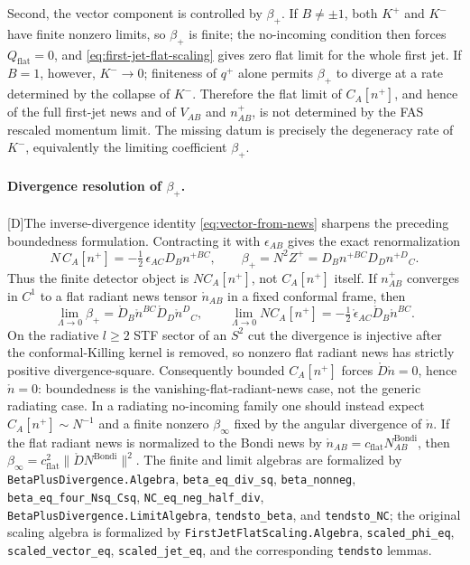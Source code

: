 \documentclass[11pt,a4paper]{article}
\newcommand{\statusD}{\textsf{[D]}}
\begin{document}
Second, the vector component is controlled by \(\beta_+\).  If \(B\neq\pm1\), both \(K^+\) and \(K^-\) have finite nonzero limits, so \(\beta_+\) is finite; the no-incoming condition then forces \(Q_{\mathrm{flat}}=0\), and \eqref{eq:first-jet-flat-scaling} gives zero flat limit for the whole first jet.  If \(B=1\), however, \(K^-\to0\); finiteness of \(q^+\) alone permits \(\beta_+\) to diverge at a rate determined by the collapse of \(K^-\).  Therefore the flat limit of \(C_A[n^+]\), and hence of the full first-jet news and of \(V_{AB}\) and \(n^+_{AB}\), is not determined by the FAS rescaled momentum limit.  The missing datum is precisely the degeneracy rate of \(K^-\), equivalently the limiting coefficient \(\beta_+\).

\paragraph{Divergence resolution of \(\beta_+\).}
\statusD The inverse-divergence identity \eqref{eq:vector-from-news} sharpens the preceding boundedness formulation.  Contracting it with \(\epsilon_{AB}\) gives the exact renormalization
\begin{equation}\label{eq:renormalized-vector-detector}
  N\,C_A[n^+]
  =
  -\tfrac12\,\epsilon_{AC}D_B n^{+BC},
  \qquad
  \beta_+
  =
  N^2Z^+
  =
  D_B n^{+BC}D_D n^{+D}{}_{C}.
\end{equation}
Thus the finite detector object is \(N C_A[n^+]\), not \(C_A[n^+]\) itself.  If \(n^+_{AB}\) converges in \(C^1\) to a flat radiant news tensor \(\mathring n_{AB}\) in a fixed conformal frame, then
\begin{equation}\label{eq:beta-divergence-limit}
  \lim_{\Lambda\to0}\beta_+
  =
  \mathring D_B\mathring n^{BC}
  \mathring D_D\mathring n^{D}{}_{C},
  \qquad
  \lim_{\Lambda\to0}N C_A[n^+]
  =
  -\tfrac12\,\mathring\epsilon_{AC}\mathring D_B\mathring n^{BC}.
\end{equation}
On the radiative \(l\ge2\) STF sector of an \(S^2\) cut the divergence is injective after the conformal-Killing kernel is removed, so nonzero flat radiant news has strictly positive divergence-square.  Consequently bounded \(C_A[n^+]\) forces \(\mathring D\mathring n=0\), hence \(\mathring n=0\): boundedness is the vanishing-flat-radiant-news case, not the generic radiating case.  In a radiating no-incoming family one should instead expect \(C_A[n^+]\sim N^{-1}\) and a finite nonzero \(\beta_\infty\) fixed by the angular divergence of \(\mathring n\).  If the flat radiant news is normalized to the Bondi news by \(\mathring n_{AB}=c_{\mathrm{flat}}N^{\mathrm{Bondi}}_{AB}\), then \(\beta_\infty=c_{\mathrm{flat}}^2\|\mathring D N^{\mathrm{Bondi}}\|^2\).  The finite and limit algebras are formalized by \texttt{BetaPlusDivergence.Algebra}, \texttt{beta\_eq\_div\_sq}, \texttt{beta\_nonneg}, \texttt{beta\_eq\_four\_Nsq\_Csq}, \texttt{NC\_eq\_neg\_half\_div}, \texttt{BetaPlusDivergence.LimitAlgebra}, \texttt{tendsto\_beta}, and \texttt{tendsto\_NC}; the original scaling algebra is formalized by \texttt{FirstJetFlatScaling.Algebra}, \texttt{scaled\_phi\_eq}, \texttt{scaled\_vector\_eq}, \texttt{scaled\_jet\_eq}, and the corresponding \texttt{tendsto} lemmas.
\end{document}
